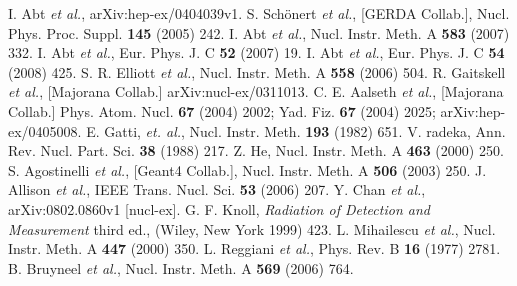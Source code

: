 \documentclass[epj]{svjour}
\begin{document}
%
\begin{thebibliography}{}
I. Abt \textit{et al.}, arXiv:hep-ex/0404039v1.
S. Sch\"onert \textit{et al.}, [GERDA Collab.],
Nucl. Phys. Proc. Suppl. \textbf{145} (2005) 242.
I. Abt \textit{et al.}, Nucl. Instr. Meth. A
\textbf{583} (2007) 332.
I. Abt \textit{et al.}, Eur. Phys. J. C \textbf{52}
(2007) 19.
I. Abt \textit{et al.}, Eur. Phys. J. C \textbf{54}
(2008) 425.
S. R. Elliott \textit{et al.}, Nucl. Instr. Meth. A
\textbf{558} (2006) 504.
R. Gaitskell \textit{et al.}, [Majorana Collab.]
arXiv:nucl-ex/0311013.
C. E. Aalseth \textit{et al.}, [Majorana Collab.]
Phys. Atom. Nucl. \textbf{67} (2004) 2002; Yad. Fiz. \textbf{67}
(2004) 2025; arXiv:hep-ex/0405008.
E. Gatti, \textit{et. al.},
Nucl. Instr. Meth. \textbf{193} (1982) 651.
V. radeka, Ann. Rev. Nucl. Part. Sci. \textbf{38}
(1988) 217.
Z. He, Nucl. Instr. Meth. A \textbf{463} (2000) 250.
S. Agostinelli \textit{et al.}, [Geant4 Collab.],
Nucl. Instr. Meth. A \textbf{506} (2003) 250.
J. Allison \textit{et al.}, IEEE
Trans. Nucl. Sci. \textbf{53} (2006) 207.
Y. Chan \textit{et al.}, arXiv:0802.0860v1 [nucl-ex].
G. F. Knoll, \textit{Radiation of Detection and
Measurement} third ed., (Wiley, New York 1999) 423.
L. Mihailescu \textit{et al.}, Nucl. Instr. Meth. A
\textbf{447} (2000) 350.
L. Reggiani \textit{et al.}, Phys. Rev. B \textbf{16}
(1977) 2781.
B. Bruyneel \textit{et al.}, Nucl. Instr. Meth. A
\textbf{569} (2006) 764.

\end{thebibliography}
%
\end{document}
